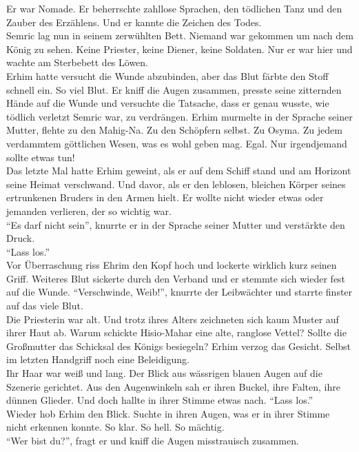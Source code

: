 Er war Nomade. Er beherrschte zahllose Sprachen, den tödlichen Tanz und den Zauber des Erzählens. 
Und er kannte die Zeichen des Todes.\\
Semric lag nun in seinem zerwühlten Bett. Niemand war gekommen um nach dem König zu sehen. Keine 
Priester, keine Diener, keine Soldaten. Nur er war hier und wachte am Sterbebett des Löwen.\\
Erhim hatte versucht die Wunde abzubinden, aber das Blut färbte den Stoff schnell ein. So viel 
Blut. Er kniff die Augen zusammen, presste seine zitternden Hände auf die Wunde und versuchte die 
Tatsache, dass er genau wusste, wie tödlich verletzt Semric war, zu verdrängen. Erhim murmelte in 
der Sprache seiner Mutter, flehte zu den Mahig-Na. Zu den Schöpfern selbst. Zu Osyma. Zu jedem 
verdammtem göttlichen Wesen, was es wohl geben mag. Egal. Nur irgendjemand sollte etwas tun!\\
Das letzte Mal hatte Erhim geweint, als er auf dem Schiff stand und am Horizont seine Heimat 
verschwand. Und davor, als er den leblosen, bleichen Körper seines ertrunkenen Bruders in den Armen 
hielt. Er wollte nicht wieder etwas oder jemanden verlieren, der so wichtig war.\\ ``Es darf nicht 
sein'', knurrte er in der Sprache seiner Mutter und verstärkte den Druck.\\
``Lass los.''\\
Vor Überraschung riss Ehrim den Kopf hoch und lockerte wirklich kurz seinen Griff. Weiteres Blut 
sickerte durch den Verband und er stemmte sich wieder fest auf die Wunde. ``Verschwinde, Weib!'', 
knurrte der Leibwächter und starrte finster auf das viele Blut.\\
Die Priesterin war alt. Und trotz ihres Alters zeichneten sich kaum Muster auf ihrer Haut ab. Warum 
schickte Hisio-Mahar eine alte, ranglose Vettel? Sollte die Großmutter das Schicksal des Königs 
besiegeln? Erhim verzog das Gesicht. Selbst im letzten Handgriff noch eine Beleidigung.\\
Ihr Haar war weiß und lang. Der Blick aus wässrigen blauen Augen auf die Szenerie gerichtet. Aus 
den Augenwinkeln sah er ihren Buckel, ihre Falten, ihre dünnen Glieder. Und doch hallte in ihrer 
Stimme etwas nach. ``Lass los.''\\
Wieder hob Erhim den Blick. Suchte in ihren Augen, was er in ihrer Stimme nicht erkennen konnte. So 
klar. So hell. So mächtig.\\
``Wer bist du?'', fragt er und kniff die Augen misstrauisch zusammen.\\

